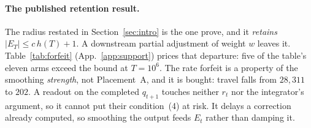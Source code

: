 \paragraph{The published retention result.} The radius restated in
Section~\ref{sec:intro} is the one \mbox{\citet[Corollary~2]{li2025o2cp}} prove, and it
\emph{retains} $|E_T| \le c\,h(T)+1$. A downstream partial
adjustment of weight $w$ leaves it. Table~\ref{tab:forfeit} (App.~\ref{app:support}) prices that
departure: five of the table's eleven arms exceed the bound at $T = 10^6$. The rate
forfeit is a property of the smoothing \emph{strength}, not Placement~A, and it is bought:
travel falls from $28{,}311$ to $202$. A readout on the completed
$q_{t+1}$ touches neither $r_t$ nor the integrator's argument, so it cannot put their condition~(4) at risk. It delays a
correction already computed, so smoothing the output feeds $E_t$ rather than damping it.

